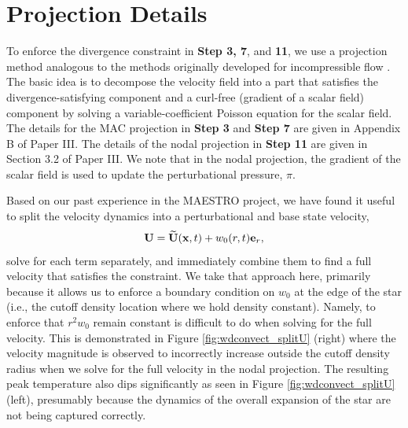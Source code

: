 \appendix
\section{Projection Details}\label{Sec:Projection}
To enforce the divergence constraint in {\bf Step 3, 7}, and {\bf 11}, we use a projection method analogous to the methods originally developed for incompressible flow \citep{almgren1998conservative,bell1989second}.
The basic idea is to decompose the velocity field into a part that satisfies the divergence-satisfying component and a curl-free (gradient of a scalar field) component by solving a variable-coefficient Poisson equation for the scalar field.
The details for the MAC projection in {\bf Step 3} and {\bf Step 7} are given in Appendix B of Paper III.  The details of the nodal projection in {\bf Step 11} are given in Section 3.2 of Paper III.
We note that in the nodal projection, the gradient of the scalar field is used to update the perturbational pressure, $\pi$.

Based on our past experience in the MAESTRO project, we have found it useful to split the velocity dynamics into a perturbational and base state velocity,
\begin{equation}
\Ub = \Ubt(\xb,t) + w_0(r,t)\eb_r,
\end{equation}
solve for each term separately, and immediately combine them to find a full velocity that satisfies the constraint.  We take that approach here, primarily because it allows us to enforce a boundary condition on $w_0$ at the edge of the star (i.e., the cutoff density location where we hold density constant).  Namely, to enforce that $r^2 w_0$ remain constant is difficult to do when solving for the full velocity. 
This is demonstrated in Figure \ref{fig:wdconvect_splitU} (right) where the velocity magnitude is observed to incorrectly increase outside the cutoff density radius when we solve for the full velocity in the nodal projection.
The resulting peak temperature also dips significantly as seen in Figure \ref{fig:wdconvect_splitU} (left), presumably because the dynamics of the overall expansion of the star are not being captured correctly.

